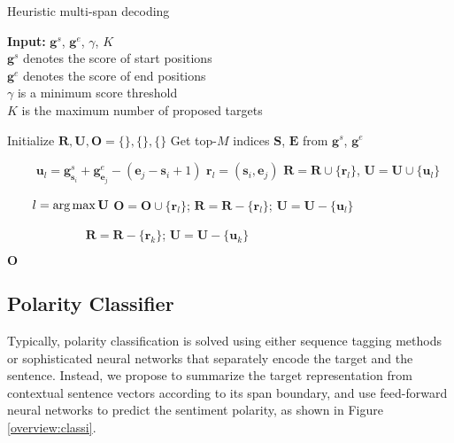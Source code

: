\documentclass[11pt,a4paper]{article}
\begin{document}
\begin{algorithm}[h]
\small
\caption{Heuristic multi-span decoding} \label{algo:hmsd}
{\bf Input:} $\mathbf{g}^s$, $\mathbf{g}^e$, $\gamma$, $K$ \\
\hspace*{0.15in} $\mathbf{g}^s$ denotes the score of start positions \\
\hspace*{0.15in} $\mathbf{g}^e$ denotes the score of end positions \\
\hspace*{0.15in} $\gamma$ is a minimum score threshold \\
\hspace*{0.15in} $K$ is the maximum number of proposed targets
\begin{algorithmic}[1]
\State Initialize $\mathbf{R}, \mathbf{U}, \mathbf{O} = \{\}, \{\}, \{\}$ \State Get top-$M$ indices $\mathbf{S}$, $\mathbf{E}$ from $\mathbf{g}^s$, $\mathbf{g}^e$ 

  
		\State $\mathbf{u}_l = \mathbf{g}^s_{\mathbf{s}_i} + \mathbf{g}^e_{\mathbf{e}_j} - (\mathbf{e}_j - \mathbf{s}_i + 1)$
		\State $\mathbf{r}_l = (\mathbf{s}_i, \mathbf{e}_j)$
		\State $\mathbf{R} = \mathbf{R} \cup \{\mathbf{r}_l\}$, $\mathbf{U} = \mathbf{U} \cup \{\mathbf{u}_l\}$
		\EndIf
	\EndFor	　　
\EndFor	

 　　\State $l = \operatorname*{arg\,max} \mathbf{U}$
	\State $\mathbf{O} = \mathbf{O} \cup \{\mathbf{r}_l\}$; $\mathbf{R} = \mathbf{R} - \{\mathbf{r}_l\}$; $\mathbf{U} = \mathbf{U} - \{\mathbf{u}_l\}$

	 　　 　　　　\State $\mathbf{R} = \mathbf{R} - \{\mathbf{r}_k\}$; $\mathbf{U} = \mathbf{U} - \{\mathbf{u}_k\}$
	　　\EndIf
	\EndFor

\EndWhile
\State \Return $\mathbf{O}$
\end{algorithmic}
\end{algorithm}


\subsection{Polarity Classifier		\label{sec:classi}}
Typically, polarity classification is solved using either sequence tagging methods or sophisticated neural networks that separately encode the target and the sentence.
Instead, we propose to summarize the target representation from contextual sentence vectors according to its span boundary, and use feed-forward neural networks to predict the sentiment polarity, as shown in Figure \ref{overview:classi}.
\end{document}
